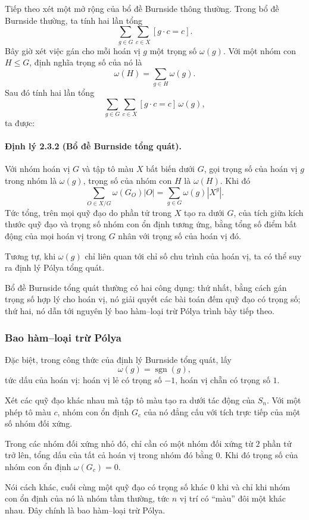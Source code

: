 \documentclass[11pt]{article}
\begin{document}
Tiếp theo xét một mở rộng của bổ đề Burnside thông thường. Trong bổ đề
Burnside thường, ta tính hai lần tổng
\[
  \sum_{g\in G}\sum_{c\in X}[g\cdot c=c].
\]
Bây giờ xét việc gán cho mỗi hoán vị \(g\) một trọng số \(\omega(g)\). Với một
nhóm con \(H\le G\), định nghĩa trọng số của nó là
\[
  \omega(H)=\sum_{g\in H}\omega(g).
\]
Sau đó tính hai lần tổng
\[
  \sum_{g\in G}\sum_{c\in X}[g\cdot c=c]\,\omega(g),
\]
ta được:

\paragraph{Định lý 2.3.2 (Bổ đề Burnside tổng quát).}
Với nhóm hoán vị \(G\) và tập tô màu \(X\) bất biến dưới \(G\), gọi trọng số
của hoán vị \(g\) trong nhóm là \(\omega(g)\), trọng số của nhóm con \(H\) là
\(\omega(H)\). Khi đó
\[
  \sum_{O\in X/G}\omega(G_O)|O|
  =
  \sum_{g\in G}\omega(g)|X^g|.
\]
Tức tổng, trên mọi quỹ đạo do phần tử trong \(X\) tạo ra dưới \(G\), của tích
giữa kích thước quỹ đạo và trọng số nhóm con ổn định tương ứng, bằng tổng số
điểm bất động của mọi hoán vị trong \(G\) nhân với trọng số của hoán vị đó.

Tương tự, khi \(\omega(g)\) chỉ liên quan tới chỉ số chu trình của hoán vị, ta
có thể suy ra định lý Pólya tổng quát.

Bổ đề Burnside tổng quát thường có hai công dụng: thứ nhất, bằng cách gán trọng
số hợp lý cho hoán vị, nó giải quyết các bài toán đếm quỹ đạo có trọng số; thứ
hai, nó dẫn tới nguyên lý bao hàm--loại trừ Pólya trình bày tiếp theo.

\subsubsection{Bao hàm--loại trừ Pólya}

Đặc biệt, trong công thức của định lý Burnside tổng quát, lấy
\[
  \omega(g)=\operatorname{sgn}(g),
\]
tức dấu của hoán vị: hoán vị lẻ có trọng số \(-1\), hoán vị chẵn có trọng số
\(1\).

Xét các quỹ đạo khác nhau mà tập tô màu tạo ra dưới tác động của \(S_n\). Với
một phép tô màu \(c\), nhóm con ổn định \(G_c\) của nó đẳng cấu với tích trực
tiếp của một số nhóm đối xứng.

Trong các nhóm đối xứng nhỏ đó, chỉ cần có một nhóm đối xứng từ \(2\) phần tử
trở lên, tổng dấu của tất cả hoán vị trong nhóm đó bằng \(0\). Khi đó trọng số
của nhóm con ổn định \(\omega(G_c)=0\).

Nói cách khác, cuối cùng một quỹ đạo có trọng số khác \(0\) khi và chỉ khi nhóm
con ổn định của nó là nhóm tầm thường, tức \(n\) vị trí có ``màu'' đôi một khác
nhau. Đây chính là bao hàm--loại trừ Pólya.
\end{document}
